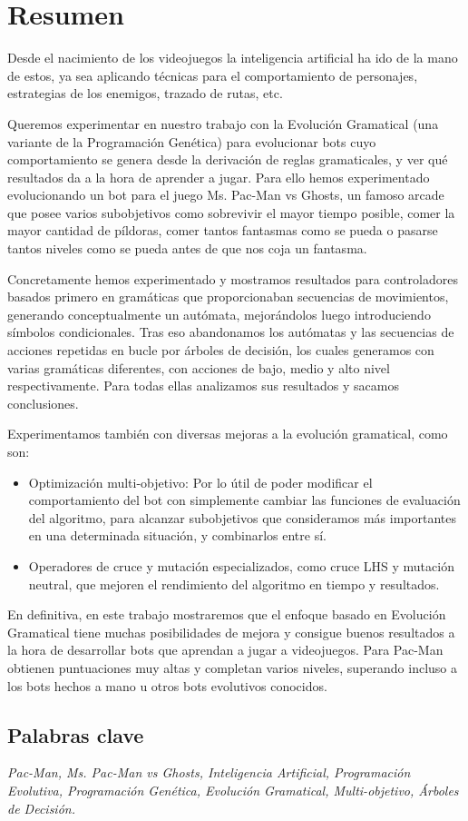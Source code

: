 \chapter{Resumen} \label{cap:resumen}
Desde el nacimiento de los videojuegos la inteligencia artificial ha ido de la mano de estos, ya sea aplicando técnicas para el comportamiento de personajes, estrategias de los enemigos, trazado de rutas, etc.

Queremos experimentar en nuestro trabajo con la Evolución Gramatical (una variante de la Programación Genética) para evolucionar bots cuyo comportamiento se genera desde la derivación de reglas gramaticales, y ver qué resultados da a la hora de aprender a jugar. Para ello hemos experimentado evolucionando un bot para el juego Ms. Pac-Man vs Ghosts, un famoso arcade que posee varios subobjetivos como sobrevivir el mayor tiempo posible, comer la mayor cantidad de píldoras, comer tantos fantasmas como se pueda o pasarse tantos niveles como se pueda antes de que nos coja un fantasma.
 
Concretamente hemos experimentado y mostramos resultados para controladores basados primero en gramáticas que proporcionaban secuencias de movimientos, generando conceptualmente un autómata, mejorándolos luego introduciendo símbolos condicionales. 
Tras eso abandonamos los autómatas y las secuencias de acciones repetidas en bucle por árboles de decisión, los cuales generamos con varias gramáticas diferentes, con acciones de bajo, medio y alto nivel respectivamente. Para todas ellas analizamos sus resultados y sacamos conclusiones. 
 
Experimentamos también con diversas mejoras a la evolución gramatical, como son:
\begin{itemize}
\item Optimización multi-objetivo: Por lo útil de poder modificar el comportamiento del bot con simplemente cambiar las funciones de evaluación del algoritmo, para alcanzar subobjetivos que consideramos más importantes en una determinada situación, y combinarlos entre sí.
\item Operadores de cruce y mutación especializados, como cruce LHS y mutación neutral, que mejoren el rendimiento del algoritmo en tiempo y resultados.
\end{itemize}
 
En definitiva, en este trabajo mostraremos que el enfoque basado en Evolución Gramatical tiene muchas posibilidades de mejora y consigue buenos resultados a la hora de desarrollar bots que aprendan a jugar a videojuegos. Para Pac-Man obtienen puntuaciones muy altas y completan varios niveles, superando incluso a los bots hechos a mano u otros bots evolutivos conocidos.

\section*{Palabras clave}
\textit{Pac-Man, Ms. Pac-Man vs Ghosts, Inteligencia Artificial, Programación Evolutiva, Programación Genética, Evolución Gramatical, Multi-objetivo, Árboles de Decisión.}
